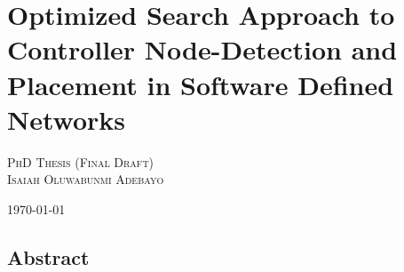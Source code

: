 \chapter*{Optimized Search Approach to Controller Node-Detection and Placement in Software Defined Networks}

\begin{center}
\Large{
\textsc{PhD Thesis (Final Draft) \\ Isaiah Oluwabunmi Adebayo \\ }
}

\today\ \
\end{center}

\clearpage

\section*{Abstract}




\listoftodos
\clearpage
